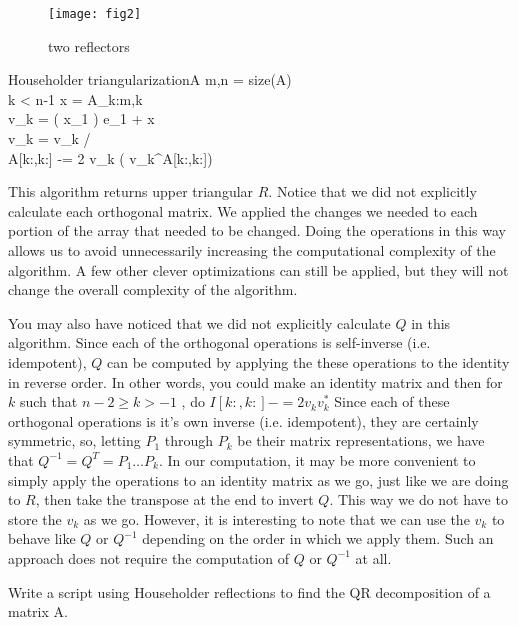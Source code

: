 \begin{figure}
	\centering
	\texttt{[image: fig2]}
	\caption{two reflectors}
	\label{fig:two reflectors}
\end{figure}

\begin{pseudo}{Householder triangularization}{A}
\label{Alg:Householder triangularization}
m,n = size(A)\\
 \leq k < n-1 \DO
\BEGIN
   x = A_{k:m,k}\\
   v_k =  \left( x_1 \right)  e_1 + x \\
   v_k = v_k /  \\
   A[k:,k:] -= 2 v_k \left( v_k^\ast A[k:,k:])
\END
\end{pseudo}

This algorithm returns upper triangular $R$.
Notice that we did not explicitly calculate each orthogonal matrix.
We applied the changes we needed to each portion of the array that needed to be changed.
Doing the operations in this way allows us to avoid unnecessarily increasing the computational complexity of the algorithm.
A few other clever optimizations can still be applied, but they will not change the overall complexity of the algorithm.

You may also have noticed that we did not explicitly calculate $Q$ in this algorithm.
Since each of the orthogonal operations is self-inverse (i.e. idempotent), $Q$ can be computed by applying the these operations to the identity in reverse order.
In other words, you could make an identity matrix and then for $k$ such that $n-2 \geq k > -1$ , do $I[k:,k:] -= 2 v_k v_k^\ast$
Since each of these orthogonal operations is it's own inverse (i.e. idempotent), they are certainly symmetric, so, letting $P_1$ through $P_k$ be their matrix representations, we have that $Q^{-1} = Q^T = P_1 \dots P_k$.
In our computation, it may be more convenient to simply apply the operations to an identity matrix as we go, just like we are doing to $R$, then take the transpose at the end to invert $Q$.
This way we do not have to store the $v_k$ as we go.
However, it is interesting to note that we can use the $v_k$ to behave like $Q$ or $Q^{-1}$ depending on the order in which we apply them.
Such an approach does not require the computation of $Q$ or $Q^{-1}$ at all.

\begin{problem}
\label{prob:HouseholderQR}
Write a script using Householder reflections to find the QR decomposition of a matrix A.
\end{problem}

